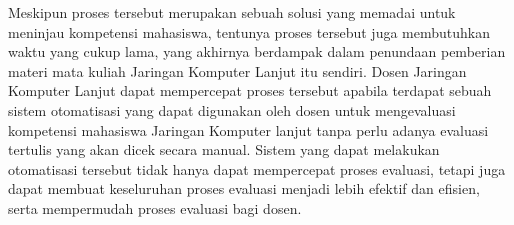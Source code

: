 Meskipun proses tersebut merupakan sebuah solusi yang memadai untuk meninjau kompetensi mahasiswa, tentunya proses tersebut juga membutuhkan waktu yang cukup lama,
yang akhirnya berdampak dalam penundaan pemberian materi mata kuliah Jaringan Komputer Lanjut itu sendiri. Dosen Jaringan Komputer Lanjut dapat mempercepat proses tersebut apabila
terdapat sebuah sistem otomatisasi yang dapat digunakan oleh dosen untuk mengevaluasi kompetensi mahasiswa Jaringan Komputer lanjut tanpa perlu adanya evaluasi tertulis yang akan dicek 
secara manual. Sistem yang dapat melakukan otomatisasi tersebut tidak hanya dapat mempercepat proses evaluasi, tetapi juga dapat membuat keseluruhan proses evaluasi menjadi lebih efektif dan
efisien, serta mempermudah proses evaluasi bagi dosen. 
\par



